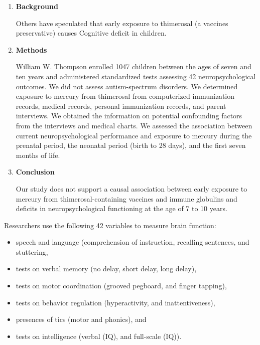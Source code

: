 \documentclass[11pt]{book}\usepackage[]{graphicx}\usepackage[]{color}
\begin{document}
\begin{enumerate}

\item \textbf{Background}

Others have speculated that early exposure to thimerosal (a vaccines preservative) causes Cognitive deficit in children.

\item \textbf{Methods}

William W. Thompson enrolled 1047 children between the ages of seven and ten years and administered standardized tests assessing 42 neuropsychological outcomes. We did not assess autism-spectrum disorders. We determined exposure to mercury from thimerosal from computerized immunization records, medical records, personal immunization records, and parent interviews.  We obtained the information on potential confounding factors from the interviews and medical charts. We assessed the association between current neuropsychological performance and exposure to mercury during the prenatal period, the neonatal period (birth to 28 days), and the first seven months of life.

\item \textbf{Conclusion}

Our study does not support a causal association between early exposure to mercury from thimerosal-containing vaccines and immune globulins and deficits in neuropsychological functioning at the age of 7 to 10 years.
\end{enumerate}       

Researchers use the following 42 variables to measure brain function:

\begin{itemize}
\item speech and language (comprehension of instruction, recalling sentences, and stuttering,
\item tests on verbal memory (no delay, short delay, long delay),
\item tests on motor coordination (grooved pegboard, and finger tapping),
\item tests on behavior regulation (hyperactivity, and inattentiveness),
\item presences of tics (motor and phonics), and 
\item tests on intelligence (verbal (IQ), and full-scale (IQ)).
\end{itemize}
\end{document}
